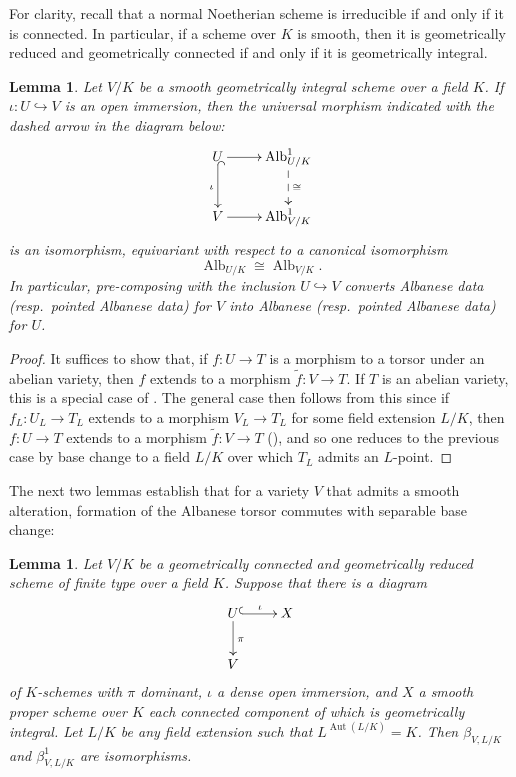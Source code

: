 \documentclass[11pt, reqno]{amsart}
\numberwithin{equation}{section}
\newtheorem{lem}[teo]{Lemma}
\theoremstyle{definition}
\theoremstyle{remark}
\def\iso{\cong}
\DeclareMathOperator{\aut}{Aut}
\DeclareMathOperator{\alb}{Alb}
\begin{document}
    
For clarity, recall that a normal Noetherian scheme is irreducible if and only if it is connected.
 In particular, if a scheme over $K$ is smooth, then it is geometrically reduced and geometrically connected if and only if it is geometrically integral. 

 \begin{lem}
  \label{L:albopen}
  Let $V/K$ be a smooth geometrically integral
    scheme 
  over a field $K$.
  If $\iota: U\hookrightarrow V$ is an open immersion, then
  the universal morphism indicated with the dashed arrow in the diagram below:
 $$
 \xymatrix{
 U\ar@{^(->}[d]_\iota \ar[r]& \operatorname{Alb}^1_{U/K} \ar@{-->}[d]^\cong\\
 V\ar[r]& \operatorname{Alb}^1_{V/K}
 }
 $$
  is an isomorphism,  equivariant with respect to a canonical
   isomorphism
   $$\alb_{U/K} \iso \alb_{V/K}.$$ In particular, pre-composing with the inclusion $U\hookrightarrow V$ converts Albanese data (resp.~pointed Albanese data) for $V$ into Albanese (resp.~pointed Albanese data) for $U$.  
 \end{lem}

 \begin{proof} 
 It suffices to show that, if $f:U \to T$ is a morphism
  to a torsor under an abelian variety, then $f$ extends to a morphism
  $\tilde f: V \to T$.  If $T$ is an abelian variety,
   this is a special
  case of \cite[\S 8.4, Cor.~6, p.234]{BLR}.  The general case then follows from this since if  $f_L:U_L\to T_L$ extends to a morphism $V_L\to T_L$ for some field extension $L/K$, then $f:U\to T$ extends to a morphism $\tilde f: V\to T$  (), and so one reduces to the previous case by base change to a field $L/K$ over which $T_L$ admits an $L$-point.
              \end{proof}

                                                   
                                      

 The next two lemmas establish that for a variety $V$ that admits a smooth
 alteration, formation of the Albanese torsor commutes with separable base
 change:

 \begin{lem}
  \label{L:albBCautLK}
  Let $V/K$ be a geometrically connected and geometrically reduced 
   scheme  of finite type over a field $K$.  Suppose that there is a
  diagram
  \[
  \xymatrix{
   U \ar@{^(->}[r]^\iota \ar[d]^\pi & X \\
   V
  }
  \]
  of $K$-schemes  with $\pi$ dominant, $\iota$ a dense open
   immersion, and $X$ a smooth proper  scheme over $K$ each connected component of which
       is geometrically integral.  Let $L/K$ be any field
  extension such that $L^{\aut(L/K)} = K$.  Then $\beta_{V,L/K}$ and
  $\beta^1_{V,L/K}$ are isomorphisms.
 \end{lem}
\end{document}

